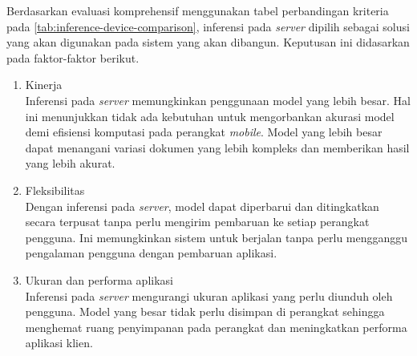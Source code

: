 Berdasarkan evaluasi komprehensif menggunakan tabel perbandingan kriteria pada \autoref{tab:inference-device-comparison}, inferensi pada \emph{server} dipilih sebagai solusi yang akan digunakan pada sistem yang akan dibangun. Keputusan ini didasarkan pada faktor-faktor berikut.
\begin{enumerate}
    \item Kinerja ~\\
    Inferensi pada \emph{server} memungkinkan penggunaan model yang lebih besar. Hal ini menunjukkan tidak ada kebutuhan untuk mengorbankan akurasi model demi efisiensi komputasi pada perangkat \emph{mobile}. Model yang lebih besar dapat menangani variasi dokumen yang lebih kompleks dan memberikan hasil yang lebih akurat.
    \item Fleksibilitas ~\\
    Dengan inferensi pada \emph{server}, model dapat diperbarui dan ditingkatkan secara terpusat tanpa perlu mengirim pembaruan ke setiap perangkat pengguna. Ini memungkinkan sistem untuk berjalan tanpa perlu mengganggu pengalaman pengguna dengan pembaruan aplikasi.
    \item Ukuran dan performa aplikasi ~\\
    Inferensi pada \emph{server} mengurangi ukuran aplikasi yang perlu diunduh oleh pengguna. Model yang besar tidak perlu disimpan di perangkat sehingga menghemat ruang penyimpanan pada perangkat dan meningkatkan performa aplikasi klien.
\end{enumerate}

